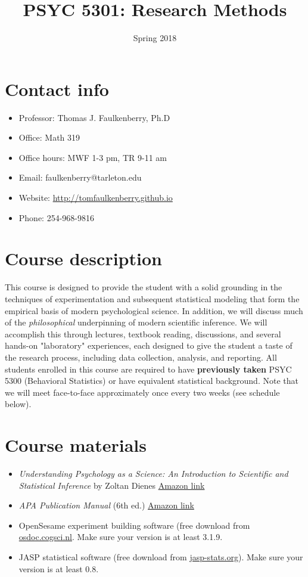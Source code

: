 \documentclass[10pt]{article}
\date{Spring 2018}
\title{PSYC 5301: Research Methods}
\begin{document}
\maketitle

\section*{Contact info}
\label{sec-1}
\begin{itemize}
\item Professor: Thomas J. Faulkenberry, Ph.D
\item Office: Math 319
\item Office hours: MWF 1-3 pm, TR 9-11 am
\item Email: faulkenberry@tarleton.edu
\item Website: \url{http://tomfaulkenberry.github.io}
\item Phone: 254-968-9816
\end{itemize}

\section*{Course description}
\label{sec-2}

This course is designed to provide the student with a solid grounding in the techniques of experimentation and subsequent statistical modeling that form the empirical basis of modern psychological science.  In addition, we will discuss much of the \emph{philosophical} underpinning of modern scientific inference.  We will accomplish this through lectures, textbook reading, discussions, and several hands-on "laboratory" experiences, each designed to give the student a taste of the research process, including data collection, analysis, and reporting. All students enrolled in this course are required to have \textbf{previously taken} PSYC 5300 (Behavioral Statistics) or have equivalent statistical background.  Note that we will meet face-to-face approximately once every two weeks (see schedule below). 

\section*{Course materials}
\label{sec-3}

\begin{itemize}
\item \emph{Understanding Psychology as a Science: An Introduction to Scientific and Statistical Inference} by Zoltan Dienes \href{https://www.amazon.com/Understanding-Psychology-Science-Introduction-Statistical/dp/023054231X}{Amazon link}
\item \emph{APA Publication Manual} (6th ed.) \href{http://www.amazon.com/Publication-Manual-American-Psychological-Association/dp/1433805618/}{Amazon link}
\item OpenSesame experiment building software (free download from \href{http://osdoc.cogsci.nl/3.1/download/}{osdoc.cogsci.nl}.  Make sure your version is at least 3.1.9.
\item JASP statistical software (free download from \href{http://jasp-stats.org}{jasp-stats.org}).  Make sure your version is at least 0.8.
\end{itemize}
\end{document}
